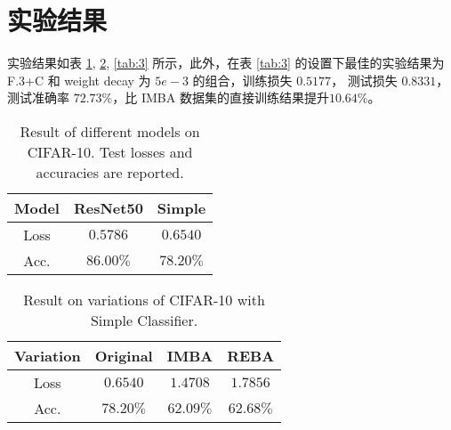 \documentclass[a4paper]{article}
\begin{document}
\section{实验结果}
实验结果如表 \ref{tab:1}, \ref{tab:2}, \ref{tab:3} 所示，此外，在表 \ref{tab:3} 的设置下最佳的实验结果为 F.3+C 和 weight decay 为 $5e-3$ 的组合，训练损失 $0.5177$， 测试损失 $0.8331$，测试准确率 $\mathbf{72.73\%}$，比 IMBA 数据集的直接训练结果提升$10.64\%$。
\begin{multicols}{2}
    \begin{table}[H]
        \centering
        \begin{tabular}{ccc}
            \hline
            Model&ResNet50&Simple\\
            \hline
            Loss& $\mathbf{0.5786}$&$0.6540$\\
            Acc.&$\mathbf{86.00\%}$&$78.20\%$\\
            \hline
            
        \end{tabular}
        \caption{Result of different models on CIFAR-10. Test losses and accuracies are reported.}
        \label{tab:1}
    \end{table}

    \begin{table}[H]
        \centering
        \begin{tabular}{cccc}
            \hline
            Variation&Original&IMBA&REBA\\
            \hline
            Loss&$0.6540$&$1.4708$&$1.7856$\\
            Acc.&$78.20\%$&$62.09\%$&$62.68\%$\\
            \hline
        \end{tabular}
        \caption{Result on variations of CIFAR-10 with Simple Classifier.}
        \label{tab:2}
    \end{table}

\end{multicols}
\end{document}
